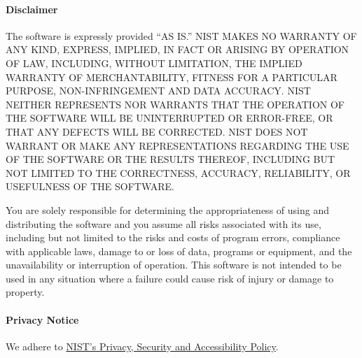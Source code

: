 \documentclass{article}
\begin{document}
\paragraph{Disclaimer}
The software is expressly provided ``AS IS.'' NIST MAKES NO WARRANTY OF
ANY KIND, EXPRESS, IMPLIED, IN FACT OR ARISING BY OPERATION OF LAW,
INCLUDING, WITHOUT LIMITATION, THE IMPLIED WARRANTY OF
MERCHANTABILITY, FITNESS FOR A PARTICULAR PURPOSE, NON-INFRINGEMENT
AND DATA ACCURACY. NIST NEITHER REPRESENTS NOR WARRANTS THAT THE
OPERATION OF THE SOFTWARE WILL BE UNINTERRUPTED OR ERROR-FREE, OR THAT
ANY DEFECTS WILL BE CORRECTED. NIST DOES NOT WARRANT OR MAKE ANY
REPRESENTATIONS REGARDING THE USE OF THE SOFTWARE OR THE RESULTS
THEREOF, INCLUDING BUT NOT LIMITED TO THE CORRECTNESS, ACCURACY,
RELIABILITY, OR USEFULNESS OF THE SOFTWARE.

You are solely responsible for determining the appropriateness of
using and distributing the software and you assume all risks
associated with its use, including but not limited to the risks and
costs of program errors, compliance with applicable laws, damage to or
loss of data, programs or equipment, and the unavailability or
interruption of operation. This software is not intended to be used in
any situation where a failure could cause risk of injury or damage to
property.

\paragraph{Privacy Notice}
We adhere to \href{http://www.nist.gov/public_affairs/privacy.cfm}{NIST's Privacy, Security and Accessibility Policy}.
\end{document}
